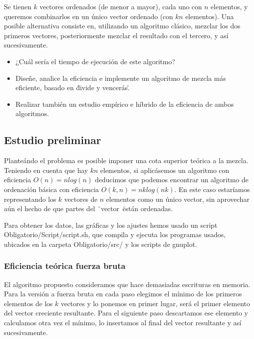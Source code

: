 
Se tienen $k$ vectores ordenados (de menor a mayor), cada uno con $n$ elementos, y queremos combinarlos en un \'unico vector ordenado (con $kn$ elementos). 
Una posible alternativa consiste en, utilizando un algoritmo cl\'asico, mezclar los dos primeros vectores, posteriormente mezclar el resultado con el tercero, y as\'i sucesivamente.

\begin{itemize}
    \item ¿Cu\'al ser\'ia el tiempo de ejecuci\'on de este algoritmo?
	\item Diseñe, analice la eficiencia e implemente un algoritmo de mezcla m\'as eficiente, 		  basado en \"divide y vencer\'as\".
	\item Realizar tambi\'en un estudio emp\'irico e h\'ibrido de la eficiencia de ambos 				  algoritmos.
\end{itemize}

\subsection{Estudio preliminar}
Plante\'ando el problema es posible imponer una cota superior te\'orica a la mezcla. Teniendo en cuenta que hay $kn$ elementos, si aplic\'asemos un algoritmo con eficiencia  $O(n)=nlog(n)$ deducimos que podemos encontrar un algoritmo de ordenaci\'on b\'asica con eficiencia $O(k,n)=nklog(nk)$. En este caso estar\'iamos representando los $k$ vectores de $n$ elementos como un \'unico vector, sin aprovechar a\'un el hecho de que partes del \"\ vector\ \" est\'an ordenadas.

Para obtener los datos, las gr\'aficas y los ajustes hemos usado un script 
Obligatorio/Script/script.sh, que compila y ejecuta los programas usados, ubicados en la carpeta Obligatorio/src/ y los scripts de gnuplot.

\subsubsection{Eficiencia te\'orica fuerza bruta}
El algoritmo propuesto consideramos que hace demasiadas escrituras en memoria.
Para la versi\'on a fuerza bruta en cada paso elegimos el m\'inimo de los primeros elementos de los $k$ vectores y lo ponemos en primer lugar, ser\'a el primer elemento del vector creciente resultante. Para el siguiente paso descartamos ese elemento y calculamos otra vez el m\'inimo, lo insertamos al final del vector resultante y as\'i sucesivamente.

